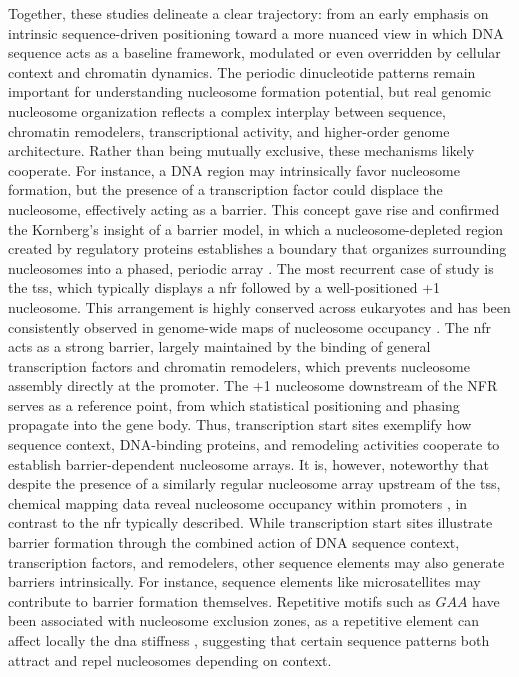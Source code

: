 \documentclass[11pt]{book}
\begin{document}
Together, these studies delineate a clear trajectory: from an early emphasis on intrinsic sequence-driven positioning toward a more nuanced view in which DNA sequence acts as a baseline framework, modulated or even overridden by cellular context and chromatin dynamics. The periodic dinucleotide patterns remain important for understanding nucleosome formation potential, but real genomic nucleosome organization reflects a complex interplay between sequence, chromatin remodelers, transcriptional activity, and higher-order genome architecture.
Rather than being mutually exclusive, these mechanisms likely cooperate. For instance, a DNA region may intrinsically favor nucleosome formation, but the presence of a transcription factor could displace the nucleosome, effectively acting as a barrier. This concept gave rise and confirmed the Kornberg's insight of a barrier model, in which a nucleosome-depleted region created by regulatory proteins establishes a boundary that organizes surrounding nucleosomes into a phased, periodic array \cite{mavrich_barrier_2008}. The most recurrent case of study is the \gls{tss}, which typically displays a \gls{nfr} followed by a well-positioned +1 nucleosome. This arrangement is highly conserved across eukaryotes and has been consistently observed in genome-wide maps of nucleosome occupancy \cite{mavrich_barrier_2008, schones_dynamic_2008, jiang_nucleosome_2009}. The \gls{nfr} acts as a strong barrier, largely maintained by the binding of general transcription factors and chromatin remodelers, which prevents nucleosome assembly directly at the promoter. The +1 nucleosome downstream of the NFR serves as a reference point, from which statistical positioning and phasing propagate into the gene body. Thus, transcription start sites exemplify how sequence context, DNA-binding proteins, and remodeling activities cooperate to establish barrier-dependent nucleosome arrays. It is, however, noteworthy that despite the presence of a similarly regular nucleosome array upstream of the \gls{tss}, chemical mapping data reveal nucleosome occupancy within promoters \cite{voong_genome-wide_2017}, in contrast to the \gls{nfr} typically described.
While transcription start sites illustrate barrier formation through the combined action of DNA sequence context, transcription factors, and remodelers, other sequence elements may also generate barriers intrinsically. For instance, sequence elements like microsatellites may contribute to barrier formation themselves. Repetitive motifs such as $GAA$ have been associated with nucleosome exclusion zones, as a repetitive element can affect locally the \gls{dna} stiffness \cite{zhao_gaa_2015}, suggesting that certain sequence patterns both attract and repel nucleosomes depending on context.
\end{document}
